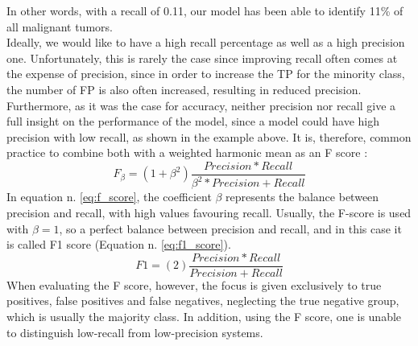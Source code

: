 In other words, with a recall of 0.11, our model has been able to identify 11\% of all malignant tumors. \\
Ideally, we would like to have a high recall percentage as well as a high precision one. Unfortunately, this is rarely the case since improving recall often comes at the expense of precision, since in order to increase the TP for the minority class, the number of FP is also often increased, resulting in reduced precision. \cite{10.5555/2559492}\\
Furthermore, as it was the case for accuracy, neither precision nor recall give a full insight on the performance of the model, since a model could have high precision with low recall, as shown in the example above. It is, therefore, common practice to combine both with a weighted harmonic mean as an F score \cite{Rijsbergen1974FOUNDATIONOE}:
\begin{equation}
F_\beta = (1+ \beta ^2)\dfrac{Precision * Recall}{\beta ^2* Precision + Recall}
\label{eq:f_score}    
\end{equation}
In equation n. \ref{eq:f_score}, the coefficient $\beta$ represents the balance between precision and recall, with high values favouring recall. Usually, the F-score is used with $\beta =1$, so a perfect balance between precision and recall, and in this case it is called F1 score (Equation n. \ref{eq:f1_score}). \cite{derczynski-2016-complementarity}
\begin{equation}
F1 = (2)\dfrac{Precision * Recall}{Precision + Recall}
\label{eq:f1_score}    
\end{equation}
When evaluating the F score, however, the focus is given exclusively to true positives, false positives and false negatives, neglecting the true negative group, which is usually the majority class. In addition, using the F score, one is unable to distinguish low-recall from low-precision systems. \cite{derczynski-2016-complementarity}\\
